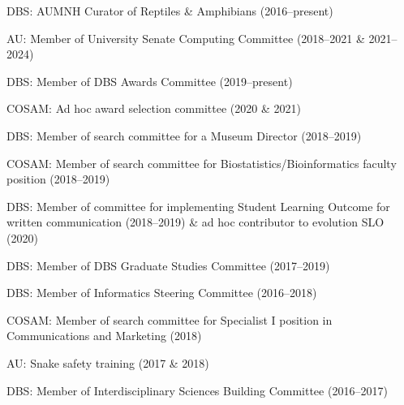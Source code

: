 \begin{veryTightItemize}
    \item DBS: AUMNH Curator of Reptiles \& Amphibians (2016--present)
    \item AU: Member of University Senate Computing Committee (2018--2021 \& 2021--2024)
    \item DBS: Member of DBS Awards Committee (2019--present)
    \item COSAM: Ad hoc award selection committee (2020 \& 2021)
    \item DBS: Member of search committee for a Museum Director (2018--2019)
    \item COSAM: Member of search committee for Biostatistics/Bioinformatics
        faculty position (2018--2019)
    \item DBS: Member of committee for implementing Student Learning Outcome
        for written communication (2018--2019) \& ad hoc contributor to
        evolution SLO (2020)
    \item DBS: Member of DBS Graduate Studies Committee (2017--2019)
    \item DBS: Member of Informatics Steering Committee (2016--2018)
    \item COSAM: Member of search committee for Specialist I position in
        Communications and Marketing (2018)
    \item AU: Snake safety training (2017 \& 2018)
    \item DBS: Member of Interdisciplinary Sciences Building Committee (2016--2017)
\end{veryTightItemize}
